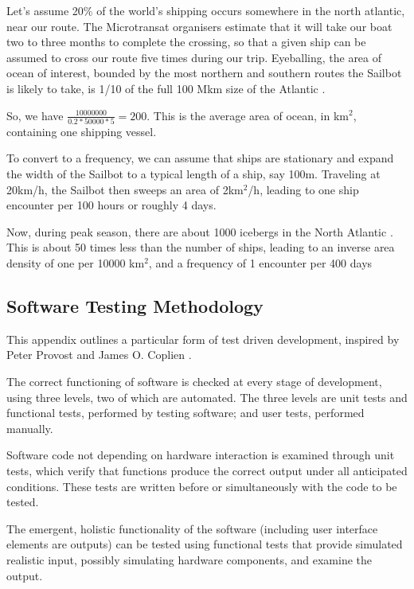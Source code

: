Let's assume 20\% of the world's shipping occurs somewhere in the north atlantic, near our route. The Microtransat organisers estimate that it will take our boat two to three months to complete the crossing, so that a given ship can be assumed to cross our route five times during our trip. Eyeballing, the area of ocean of interest, bounded by the most northern and southern routes the Sailbot is likely to take, is 1/10 of the full 100 Mkm size of the Atlantic \cite{worldatlas__atlantic-ocean}.

So, we have $\frac{10000000}{0.2*50000*5}=200$. This is the average area of ocean, in km$^2$, containing one shipping vessel.

To convert to a frequency, we can assume that ships are stationary and expand the width of the Sailbot to a typical length of a ship, say 100m. Traveling at 20km/h, the Sailbot then sweeps an area of 2km$^2$/h, leading to one ship encounter per 100 hours or roughly 4 days.

Now, during peak season, there are about 1000 icebergs in the North Atlantic \cite{natgeo__iceberg-frequency}. This is about 50 times less than the number of ships, leading to an inverse area density of one per 10000 km$^2$, and a frequency of 1 encounter per 400 days


\subsection{\label{app:software-testing-methodology}Software Testing Methodology}
This appendix outlines a particular form of test driven development, inspired by Peter Provost \cite{provost-tdd} and James O. Coplien \cite{coplien-tdd-waste}.

The correct functioning of software is checked at every stage of development, using three levels, two of which are automated. The three levels are unit tests and functional tests, performed by testing software; and user tests, performed manually.

Software code not depending on hardware interaction is examined through unit tests, which verify that functions produce the correct output under all anticipated conditions. These tests are written before or simultaneously with the code to be tested.

The emergent, holistic functionality of the software (including user interface elements are outputs) can be tested using functional tests that provide simulated realistic input, possibly simulating hardware components, and examine the output.

